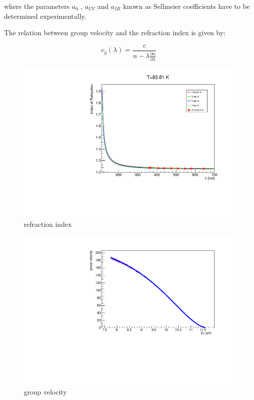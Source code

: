 \documentclass[a4paper]{jpconf}
\begin{document}
where the parameters $a_0$ , $a_{UV}$ and $a_{IR}$ known as Sellmeier coefficients have to be determined
experimentally.
 
 The relation between group velocity and the refraction index is given by:

\begin{equation}
  v_g (\lambda)= \frac{c}{n-\lambda \frac{\partial{n}}{\partial{\lambda}}}
      \label{equ:vgroup}
\end{equation}

 


\begin{figure}[ht]
\begin{center}
\includegraphics[width=35.5pc]{sellmeier.pdf}
\end{center}
\caption{\label{fig:sellmeier}refraction index}
\end{figure}
\begin{figure}[ht]
\begin{center}
\includegraphics[width=35.5pc]{vg.pdf}
\end{center}
\caption{\label{fig:vg}group velocity}
\end{figure}
\end{document}
